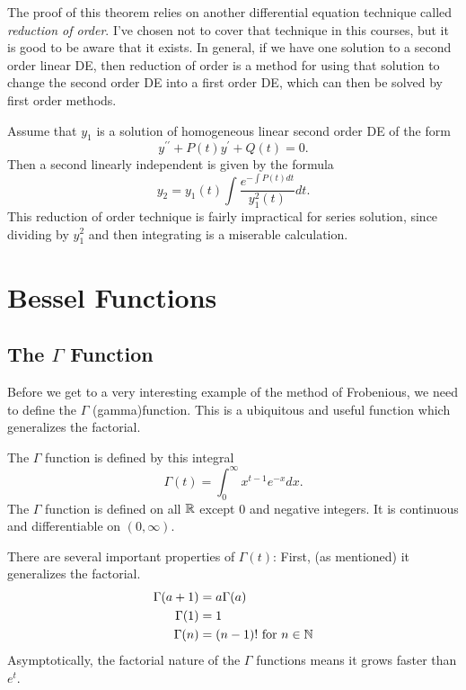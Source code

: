 \documentclass[fleqn,letterpaper]{report}
\begin{document}
The proof of this theorem relies on another differential
equation technique called \emph{reduction of order}. I've
chosen not to cover that technique in this courses, but it is
good to be aware that it exists. In general, if we have one
solution to a second order linear DE, then reduction of order
is a method for using that solution to change the second order
DE into a first order DE, which can then be solved by first
order methods.

\begin{thm}
Assume that $y_1$ is a solution of homogeneous linear second
order DE of the form
\begin{equation*}
y^{\prime \prime} + P(t) y^\prime + Q(t) = 0.
\end{equation*}
Then a second linearly independent is given by the formula
\begin{equation*}
y_2 = y_1(t) \int \frac{e^{- \int P(t) dt}}{y_1^2(t)} dt.
\end{equation*}
This reduction of order technique is fairly impractical for
series solution, since dividing by $y_1^2$ and then
integrating is a miserable calculation. 
\end{thm}

\section{Bessel Functions}
\label{bessel-functions}

\subsection{The $\Gamma$ Function}
\label{gamma-function}

Before we get to a very interesting example of the method of
Frobenious, we need to define the $\Gamma$ (gamma)function.
This is a ubiquitous and useful function which generalizes the
factorial. 

\begin{defn}
The $\Gamma$ function is defined by this integral
\begin{equation*}
\Gamma(t) = \int_0^\infty x^{t-1}e^{-x} dx.
\end{equation*}
The $\Gamma$ function is defined on all $\mathbb{R}$ except 0 and
negative integers. It is continuous and differentiable on $(0,
\infty)$. 
\end{defn}

There are several important properties of $\Gamma(t)$:
First, (as mentioned) it generalizes the factorial.
\begin{align*}
\Gamma(a+1) & = a \Gamma(a) \\
\Gamma(1) & = 1 \\
\Gamma(n) & = (n-1)! \text{ for } n \in \mathbb{N} 
\end{align*}
Asymptotically, the factorial nature of the $\Gamma$ functions
means it grows faster than $e^t$. 
\end{document}
